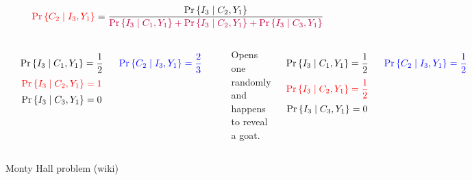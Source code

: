 \begin{frame}{}
  \[
    \textcolor{red}{\Pr\left\{C_2 \mid I_3, Y_1\right\}} = \frac{\Pr{\left\{I_3 \mid C_2, Y_1\right\}}}
      {\textcolor{purple}{\Pr\left\{I_3 \mid C_1, Y_1\right\} + \Pr\left\{I_3 \mid C_2, Y_1\right\} + \textcolor{purple}{\Pr\left\{I_3 \mid C_3, Y_1\right\}}}}
  \]

  \pause
  \vspace{0.30cm}
  \begin{columns}
      \centerline{\textsc{}}

      \[
	\Pr\left\{I_3 \mid C_1, Y_1\right\} = \frac{1}{2}
      \]
      \[
	\textcolor{red}{\Pr\left\{I_3 \mid C_2, Y_1\right\} = 1}
      \]
      \[
	\Pr\left\{I_3 \mid C_3, Y_1\right\} = 0
      \]

      \[
	\textcolor{blue}{\Pr\left\{C_2 \mid I_3, Y_1\right\} = \frac{2}{3}}
      \]
      \pause
      \centerline{\textsc{}}
      \begin{center}
	{Opens one randomly and happens to reveal a goat.}
      \end{center}

      \pause
      \vspace{-0.50cm}
      \[
	\Pr\left\{I_3 \mid C_1, Y_1\right\} = \frac{1}{2}
      \]
      \[
	\textcolor{red}{\Pr\left\{I_3 \mid C_2, Y_1\right\} = \frac{1}{2}}
      \]
      \[
	\Pr\left\{I_3 \mid C_3, Y_1\right\} = 0
      \]

      \[
	\textcolor{blue}{\Pr\left\{C_2 \mid I_3, Y_1\right\} = \frac{1}{2}}
      \]
  \end{columns}
\end{frame}

\begin{frame}{}

  \vspace{-0.30cm}
  \centerline{Monty Hall problem (wiki)}
\end{frame}
